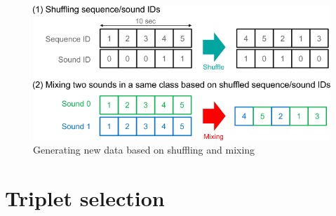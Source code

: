 \begin{figure}[htbp]
	\centering
	\includegraphics[scale=0.5]{baa-documentation/img/DCASE_data_augmentation.png}
	\caption[Generating new data based on shuffling and mixing]{Generating new data based on shuffling and mixing \footnotemark}
	\label{fig:DCASE-Data-Augmentation}
\end{figure}

\section{Triplet selection}
\label{sec:Triplet-Selection}

